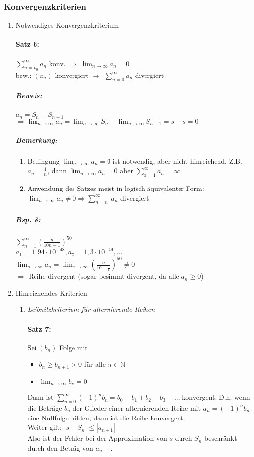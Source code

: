 \subsubsection{Konvergenzkriterien}
\begin{enumerate} [label= \arabic*., wide]
\item Notwendiges Konvergenzkriterium
\paragraph{Satz 6:} $\sum_{n=n_0}^\infty a_n$ konv. $\Rightarrow$ $\lim_{n\to \infty} a_n = 0$\\
bzw.: $(a_n)$ konvergiert $\Rightarrow$ $\sum_{n=0}^\infty a_n$ divergiert 
\subparagraph{Beweis:} $a_n = S_n - S_{n-1}$\\
$\Rightarrow \lim_{n\to \infty}a_n = \lim_{n\to\infty}S_n - \lim_{n\to\infty}S_{n-1}=s-s=0$
\subparagraph{Bemerkung:} 
\begin{enumerate}
\item Bedingung $\lim_{n\to\infty}a_n = 0$ ist notwendig, aber nicht hinreichend. Z.B. $a_n=\frac{1}{n}$, dann $\lim_{n\to\infty}a_n=0$ aber $\sum_{n=1}^\infty a_n=\infty$
\item Anwendung des Satzes meist in logisch äquivalenter Form: $\lim_{n \to \infty} a_n \not = 0 \Rightarrow \sum_{n=n_0}^\infty a_n$ divergiert
\end{enumerate}

\subparagraph{Bsp. 8:} $\sum_{n=1}^\infty \left(\frac{n}{10n-1}\right)^{50}$\\
$a_1=1,94\cdot 10^{-48}, a_2=1,3 \cdot 10^{-49}, ...$\\
$\lim_{n\to\infty}a_n=\lim_{n\to\infty}\left(\frac{n}{10-\frac{1}{n}}\right)^{50}\not = 0$\\
$\Rightarrow$ Reihe divergent (sogar besimmt divergent, da alle $a_n \geq 0$)

\item Hinreichendes Kriterien
\begin{enumerate}[label=(\Alph*),wide]
\item \emph{Leibnitzkriterium für alternierende Reihen}
\paragraph{Satz 7:} Sei $(b_n)$ Folge mit 
\begin{itemize}
\item $b_n \geq b_{n+1} > 0$ für alle $n \in \mathbb{N}$
\item $\lim_{n\to\infty} b_n = 0$
\end{itemize}
Dann ist $\sum_{n=0}^\infty(-1)^n b_n=b_0-b_1+b_2-b_3+...$ konvergent. D.h. wenn die Beträge $b_n$ der Glieder einer alternierenden Reihe mit $a_n = (-1)^n b_n$ eine Nullfolge bilden, dann ist die Reihe konvergent.\\
Weiter gilt: $|s-S_n| \leq | a_{n+1} |$\\
Also ist der Fehler bei der Approximation von $s$ durch $S_n$ beschränkt durch den Beträg von $a_{n+1}$.


\end{enumerate}
\end{enumerate}

